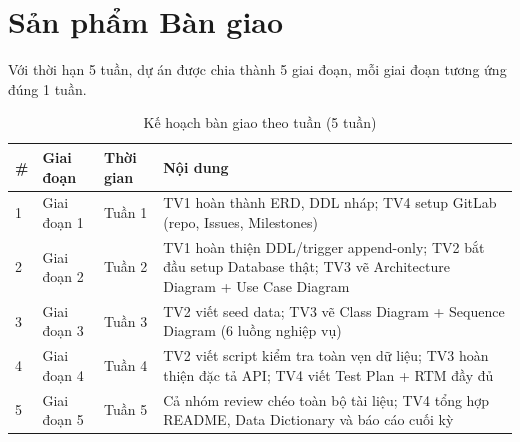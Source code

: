 \section{Sản phẩm Bàn giao}
\label{sec:deliverables-list}

Với thời hạn 5 tuần, dự án được chia thành 5 giai đoạn, mỗi giai đoạn tương ứng đúng 1 tuần.

\begin{table}[htbp]
    \centering
    \small
    \caption{Kế hoạch bàn giao theo tuần (5 tuần)}
    \begin{tabular}{|p{0.6cm}|p{2cm}|p{2cm}|p{8cm}|}
        \hline
        \textbf{\#} & \textbf{Giai đoạn} & \textbf{Thời gian} & \textbf{Nội dung} \\
        \hline
        1 & Giai đoạn 1 & Tuần 1 & TV1 hoàn thành ERD, DDL nháp; TV4 setup GitLab (repo, Issues, Milestones) \\
        \hline
        2 & Giai đoạn 2 & Tuần 2 & TV1 hoàn thiện DDL/trigger append-only; TV2 bắt đầu setup Database thật; TV3 vẽ Architecture Diagram + Use Case Diagram \\
        \hline
        3 & Giai đoạn 3 & Tuần 3 & TV2 viết seed data; TV3 vẽ Class Diagram + Sequence Diagram (6 luồng nghiệp vụ) \\
        \hline
        4 & Giai đoạn 4 & Tuần 4 & TV2 viết script kiểm tra toàn vẹn dữ liệu; TV3 hoàn thiện đặc tả API; TV4 viết Test Plan + RTM đầy đủ \\
        \hline
        5 & Giai đoạn 5 & Tuần 5 & Cả nhóm review chéo toàn bộ tài liệu; TV4 tổng hợp README, Data Dictionary và báo cáo cuối kỳ \\
        \hline
    \end{tabular}
\end{table}

